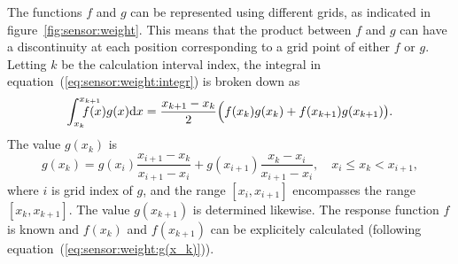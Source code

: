 The functions $f$ and $g$ can be represented using different grids,
as indicated in figure~\ref{fig:sensor:weight}. This means that the product between $f$ and $g$ can have
a discontinuity at each position corresponding to a grid point of
either $f$ or $g$. Letting $k$ be the calculation interval index,
the integral in equation~(\ref{eq:sensor:weight:integr}) is broken down as
\begin{equation}
  \label{eq:sensor:weight:part integr}
  \int_{x_k}^{x_{k+1}}\hspace{-4ex}f(x)g(x)\DiffD x  = 
    \frac{x_{k+1}-x_k}{2}\Bigl( f(x_k) g(x_k) + 
    f(x_{k+1}) g(x_{k+1}) \bigr).
\end{equation}
The value $g(x_k)$ is 
\begin{equation}
  \label{eq:sensor:weight:g(x_k)} 
  g(x_k) = g(x_i)\frac{x_{i+1}-x_k}{x_{i+1}-x_i} + 
           g(x_{i+1})\frac{x_k-x_i}{x_{i+1}-x_i}, \quad 
           x_i \leq x_k < x_{i+1},
\end{equation}
where $i$ is grid index of $g$, and the range $[x_i,x_{i+1}]$
encompasses the range $[x_k,x_{k+1}]$. The value $g(x_{k+1})$ is
determined likewise. The response function $f$ is
known and $f(x_k)$ and $f(x_{k+1})$ can be explicitely calculated
(following equation~(\ref{eq:sensor:weight:g(x_k)})).
   
